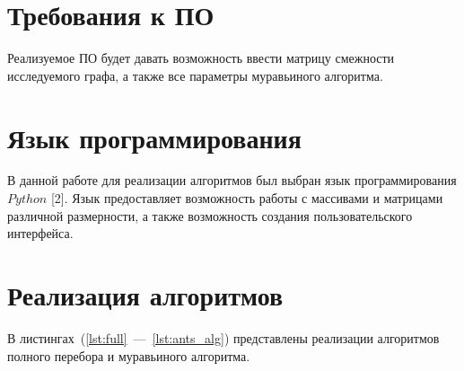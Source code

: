 \documentclass{bmstu}
\begin{document}
\section{Требования к ПО}
Реализуемое ПО будет давать возможность ввести матрицу смежности исследуемого графа, а также все параметры муравьиного алгоритма.

\section{Язык программирования}
В данной работе для реализации алгоритмов был выбран язык программирования $Python$ [2]. Язык предоставляет возможность работы с массивами и матрицами различной размерности, а также возможность создания пользовательского интерфейса.

\section{Реализация алгоритмов}

В листингах~(\ref{lst:full}~---~\ref{lst:ants_alg}) представлены реализации алгоритмов полного перебора и муравьиного алгоритма.

\clearpage
\end{document}
